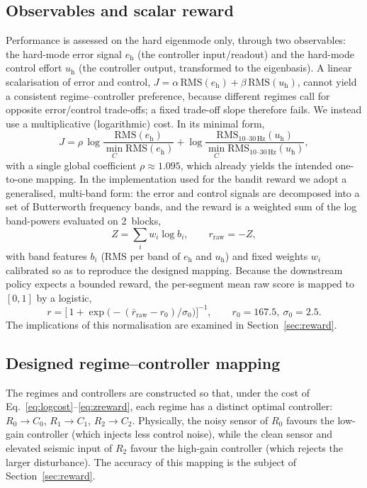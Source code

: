 \documentclass[11pt,a4paper]{article}
\newcommand{\SI}[2]{#1\,\text{#2}}
\newcommand{\Chard}{u_{\mathrm{h}}}
\newcommand{\ehard}{e_{\mathrm{h}}}
\newcommand{\Cz}{C_{0}}
\newcommand{\Co}{C_{1}}
\newcommand{\Ct}{C_{2}}
\begin{document}
\subsection{Observables and scalar reward}\label{sec:pr-reward}
Performance is assessed on the hard eigenmode only, through two observables: the
hard-mode error signal $\ehard$ (the controller input/readout) and the hard-mode
control effort $\Chard$ (the controller output, transformed to the eigenbasis).
A linear scalarisation of error and control, $J = \alpha\,\mathrm{RMS}(\ehard) +
\beta\,\mathrm{RMS}(\Chard)$, cannot yield a consistent regime--controller
preference, because different regimes call for opposite error/control
trade-offs; a fixed trade-off slope therefore fails. We instead use a
multiplicative (logarithmic) cost. In its minimal form,
\begin{equation}
  J = \rho\,\log\!\frac{\mathrm{RMS}(\ehard)}{\min_C \mathrm{RMS}(\ehard)}
    + \log\!\frac{\mathrm{RMS}_{10\text{--}30\,\mathrm{Hz}}(\Chard)}
                 {\min_C \mathrm{RMS}_{10\text{--}30\,\mathrm{Hz}}(\Chard)},
  \label{eq:logcost}
\end{equation}
with a single global coefficient $\rho \approx 1.095$, which already yields the
intended one-to-one mapping. In the implementation used for the bandit reward we
adopt a generalised, multi-band form: the error and control signals are
decomposed into a set of Butterworth frequency bands, and the reward is a
weighted sum of the log band-powers evaluated on \SI{2}{s} blocks,
\begin{equation}
  Z = \sum_i w_i \log b_i, \qquad r_{\mathrm{raw}} = -Z,
  \label{eq:zreward}
\end{equation}
with band features $b_i$ (RMS per band of $\ehard$ and $\Chard$) and fixed
weights $w_i$ calibrated so as to reproduce the designed mapping. Because the
downstream policy expects a bounded reward, the per-segment mean raw score is
mapped to $[0,1]$ by a logistic,
\begin{equation}
  r = \big[\,1 + \exp\!\big(-(\bar r_{\mathrm{raw}} - r_0)/\sigma_0\big)\big]^{-1},
  \qquad r_0 = 167.5,\ \sigma_0 = 2.5.
  \label{eq:logistic}
\end{equation}
The implications of this normalisation are examined in
Section~\ref{sec:reward}.

\subsection{Designed regime--controller mapping}\label{sec:pr-map}
The regimes and controllers are constructed so that, under the cost of
Eq.~\eqref{eq:logcost}--\eqref{eq:zreward}, each regime has a distinct optimal
controller: $R_0 \to \Cz$, $R_1 \to \Co$, $R_2 \to \Ct$. Physically, the noisy
sensor of $R_0$ favours the low-gain controller (which injects less control
noise), while the clean sensor and elevated seismic input of $R_2$ favour the
high-gain controller (which rejects the larger disturbance). The accuracy of
this mapping is the subject of Section~\ref{sec:reward}.
\end{document}
